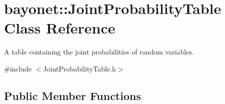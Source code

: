 \hypertarget{classbayonet_1_1_joint_probability_table}{\section{bayonet\-:\-:Joint\-Probability\-Table Class Reference}
\label{classbayonet_1_1_joint_probability_table}
}


A table containing the joint probabilities of random variables.  




{\ttfamily \#include $<$Joint\-Probability\-Table.\-h$>$}

\subsection*{Public Member Functions}
